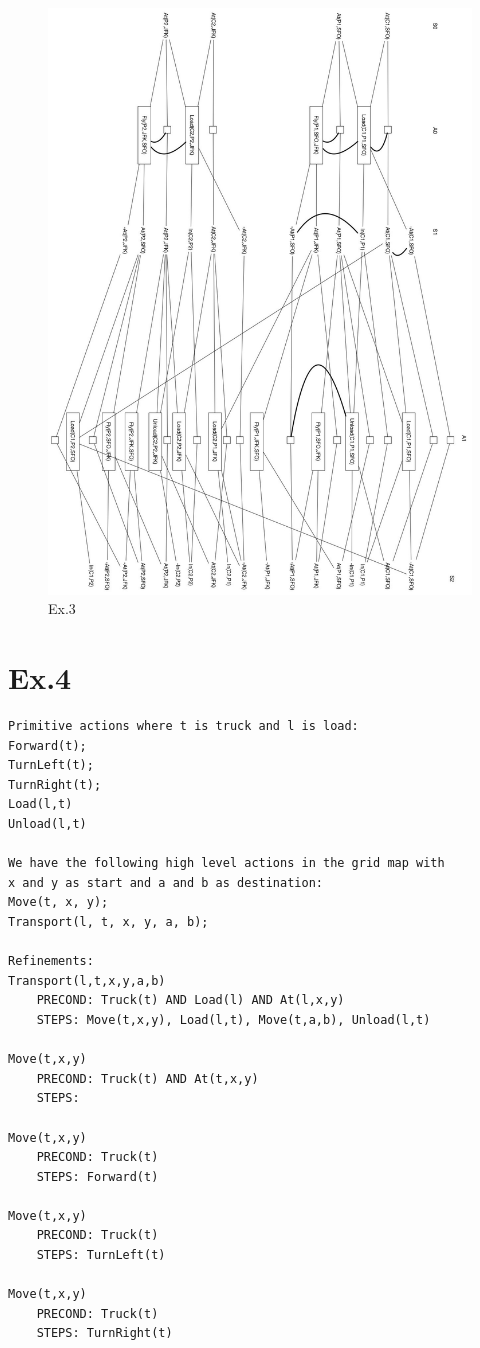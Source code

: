 \documentclass[11pt]{article}
\begin{document}
\begin{figure}
	\centering
  \includegraphics[width=1.0\textwidth]{planninggraph}
	\caption{Ex.3}
	\label{fig:3}
\end{figure}


\section*{Ex.4}
\begin{lstlisting}[mathescape=true]
Primitive actions where t is truck and l is load:
Forward(t);
TurnLeft(t);
TurnRight(t);
Load(l,t)
Unload(l,t)

We have the following high level actions in the grid map with 
x and y as start and a and b as destination:
Move(t, x, y);
Transport(l, t, x, y, a, b);

Refinements:
Transport(l,t,x,y,a,b)
    PRECOND: Truck(t) AND Load(l) AND At(l,x,y)
    STEPS: Move(t,x,y), Load(l,t), Move(t,a,b), Unload(l,t)

Move(t,x,y)
    PRECOND: Truck(t) AND At(t,x,y)
    STEPS:

Move(t,x,y)
    PRECOND: Truck(t)
    STEPS: Forward(t)
    
Move(t,x,y)
    PRECOND: Truck(t)
    STEPS: TurnLeft(t)
    
Move(t,x,y)
    PRECOND: Truck(t)
    STEPS: TurnRight(t)
\end{lstlisting}
\end{document}
